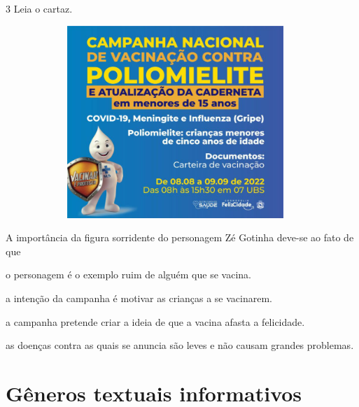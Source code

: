 \num{3} Leia o cartaz.

\begin{figure}[H]
\centering
\includegraphics[width=4.21103in,height=2.86458in]{./imgSAEB_8_POR/media/image40.png}
\end{figure}

A importância da figura sorridente do personagem Zé Gotinha deve-se ao
fato de que

\begin{escolha}
\tightlist
\item
  o personagem é o exemplo ruim de alguém que se vacina.
\item
  a intenção da campanha é motivar as crianças a se vacinarem.
\item
  a campanha pretende criar a ideia de que a vacina afasta a felicidade.
\item
  as doenças contra as quais se anuncia são leves e não causam grandes
  problemas.
\end{escolha}


\chapter{Gêneros textuais informativos}


